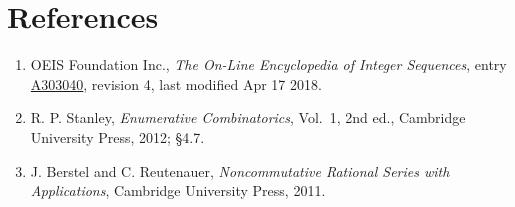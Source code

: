 \documentclass[11pt]{article}
\theoremstyle{definition}
\begin{document}
\section{References}

\begin{enumerate}

\item OEIS Foundation Inc., \emph{The On-Line Encyclopedia of Integer Sequences}, entry \href{https://oeis.org/A303040}{A303040}, revision 4, last modified Apr 17 2018.

\item R. P. Stanley, \emph{Enumerative Combinatorics}, Vol.~1, 2nd ed., Cambridge University Press, 2012; \S4.7.

\item J. Berstel and C. Reutenauer, \emph{Noncommutative Rational Series with Applications}, Cambridge University Press, 2011.

\end{enumerate}
\end{document}
